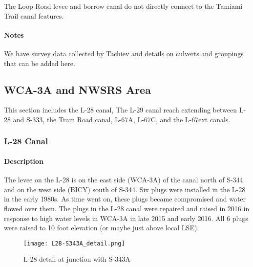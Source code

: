 The Loop Road levee and borrow canal do not directly connect to the Tamiami Trail canal features.

\begin{notes}
\paragraph{Notes}
We have survey data collected by Tachiev and details on culverts and groupings that can be added here.
\end{notes}

\clearpage


\subsection{WCA-3A and NWSRS Area}
This section includes the L-28 canal, The L-29 canal reach extending between L-28 and S-333, the Tram Road canal, L-67A, L-67C, and the L-67ext canals.
\subsubsection{L-28 Canal}

\paragraph{Description}
The levee on the L-28 is on the east side (WCA-3A) of the canal north of S-344 and on the west side (BICY) south of S-344.
Six plugs were installed in the L-28 in the early 1980s. As time went on, these plugs became compromised and water flowed over them.  The plugs in the L-28 canal were repaired and raised in 2016 in response to high water levels in WCA-3A in late 2015 and early 2016.  All 6 plugs were raised to 10 foot elevation \citep{ USACE2016TempDev} (or maybe just above local LSE).

\begin{figure}[!h]
  \begin{center}
  \texttt{[image: L28-S343A\_detail.png]}
  \caption{L-28 detail at junction with S-343A}
  \end{center}
\end{figure}

